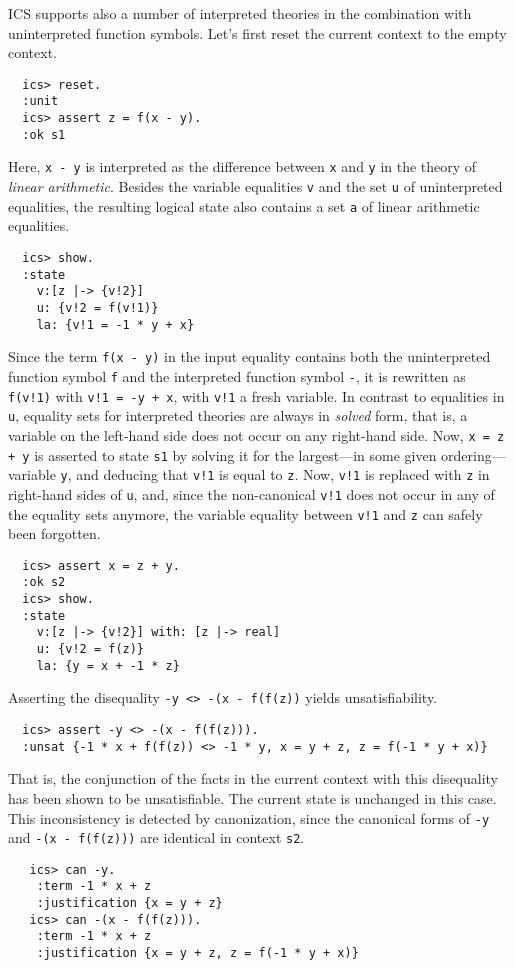 \documentclass[12pt]{article}
\begin{document}
ICS supports also a number of interpreted theories in the combination
with uninterpreted function symbols. Let's first reset the current
context to the empty context.
  \begin{verbatim}
  ics> reset.
  :unit
  ics> assert z = f(x - y).
  :ok s1
  \end{verbatim}
Here, {\tt x - y} is interpreted as the difference between {\tt x}
and {\tt y} in the theory of {\em linear arithmetic}\@.  Besides the
variable equalities {\tt v} and the set {\tt u} of uninterpreted equalities,
the resulting logical state also contains a set {\tt a} of linear arithmetic 
equalities.
  \begin{verbatim}
  ics> show.
  :state
    v:[z |-> {v!2}]
    u: {v!2 = f(v!1)}
    la: {v!1 = -1 * y + x}
  \end{verbatim}
Since the term {\tt f(x - y)} in the input equality contains both the
uninterpreted function symbol {\tt f} and the interpreted function
symbol {\tt -}, it is rewritten as {\tt f(v!1)} with {\tt v!1 = -y + x},
with {\tt v!1} a fresh variable. In contrast to equalities in {\tt u},
equality sets for interpreted theories are always in {\em solved} form, that is,
a variable on the left-hand side does not occur on any right-hand side. 
Now, {\tt x = z + y} is asserted to state {\tt s1} by solving it
for the largest---in some given ordering---variable {\tt y}, and deducing
that {\tt v!1} is equal to {\tt z}. Now, {\tt v!1} is replaced with
{\tt z} in right-hand sides of {\tt u}, and, since the non-canonical
{\tt v!1} does not occur in any of the equality sets anymore, the variable
equality between {\tt v!1} and {\tt z} can safely been forgotten.
  \begin{verbatim}
  ics> assert x = z + y.
  :ok s2
  ics> show.
  :state
    v:[z |-> {v!2}] with: [z |-> real]
    u: {v!2 = f(z)}
    la: {y = x + -1 * z}
  \end{verbatim}
Asserting the disequality {\tt -y <> -(x - f(f(z))} yields unsatisfiability.
  \begin{verbatim}
  ics> assert -y <> -(x - f(f(z))).
  :unsat {-1 * x + f(f(z)) <> -1 * y, x = y + z, z = f(-1 * y + x)}
  \end{verbatim}
That is, the conjunction of the facts in the current context with this
disequality has been shown to be unsatisfiable.  The current state is unchanged 
in this case. This inconsistency is detected by canonization, since the
canonical forms of {\tt -y} and {\tt -(x - f(f(z)))} are identical in context {\tt s2}\@.
   \begin{verbatim}
   ics> can -y. 
    :term -1 * x + z
    :justification {x = y + z}
   ics> can -(x - f(f(z))).
    :term -1 * x + z
    :justification {x = y + z, z = f(-1 * y + x)}
   \end{verbatim}
\end{document}
